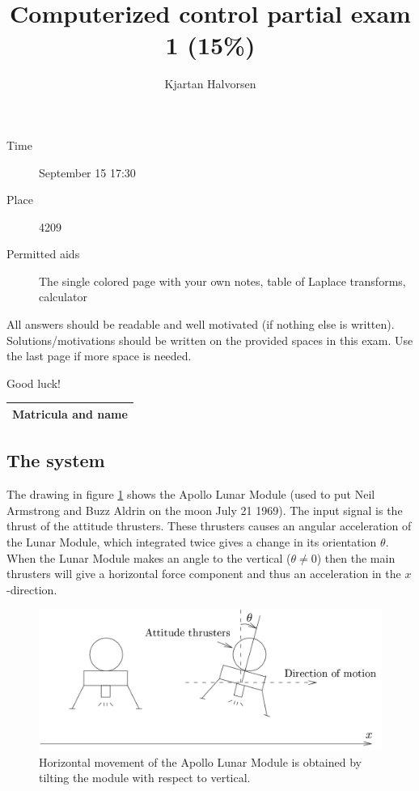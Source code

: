 \documentclass[letter,11pt]{scrartcl}
\title{Computerized control partial exam 1 (15\%)}
\author{Kjartan Halvorsen}
\date{}
\newcommand{\bmpl}{\begin{minipage}[t]{\textwidth}}
\newcommand{\emp}{\end{minipage}}
\begin{document}
\maketitle


\begin{description}
\item[Time] September 15 17:30
\item[Place] 4209
\item[Permitted aids] The single colored page with your own notes, table of Laplace transforms, calculator
\end{description}

All answers should be readable and well motivated (if nothing else is written). Solutions/motivations should be written on the provided spaces in this exam. Use the last page if more space is needed.

\begin{center}
{\Large Good luck!} \\
\end{center}

\begin{tabular}{|l|l|}
\hline
\multicolumn{2}{|l|}{\bmpl
Matricula and name
\vspace*{18mm}
\emp}\\
\hline

\end{tabular}


\clearpage
\subsection*{The system}
The drawing in figure \ref{fig:apollo-sketch} shows the Apollo Lunar Module (used to put Neil Armstrong and Buzz Aldrin on the moon July 21 1969). The input signal is the thrust of the attitude thrusters. These thrusters causes an angular acceleration of the Lunar Module, which integrated twice gives a change in its orientation $\theta$.  When the Lunar Module makes an angle to the vertical ($\theta \neq 0$) then the main thrusters will give a horizontal force component and thus an acceleration in the $x$-direction. 
\begin{figure}[hbtp]
\begin{center}
  \includegraphics[width=0.6\linewidth]{apollo-2.png}
\end{center}
\caption{Horizontal movement of the Apollo Lunar Module is obtained by tilting the module with respect to vertical.}
\label{fig:apollo-sketch}
\end{figure}
\end{document}
